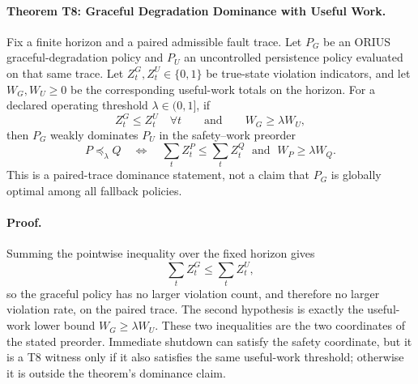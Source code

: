 \paragraph{Theorem T8: Graceful Degradation Dominance with Useful Work.}
Fix a finite horizon and a paired admissible fault trace. Let \(P_G\) be an
ORIUS graceful-degradation policy and \(P_U\) an uncontrolled persistence policy
evaluated on that same trace. Let \(Z_t^G,Z_t^U\in\{0,1\}\) be true-state
violation indicators, and let \(W_G,W_U\ge0\) be the corresponding useful-work
totals on the horizon. For a declared operating threshold
\(\lambda\in(0,1]\), if
\[
  Z_t^G\le Z_t^U\quad \forall t
  \qquad\text{and}\qquad
  W_G\ge \lambda W_U,
\]
then \(P_G\) weakly dominates \(P_U\) in the safety--work preorder
\[
  P\preceq_{\lambda} Q
  \quad\Longleftrightarrow\quad
  \sum_t Z_t^P\le\sum_t Z_t^Q
  \;\text{ and }\;
  W_P\ge\lambda W_Q .
\]
This is a paired-trace dominance statement, not a claim that \(P_G\) is globally
optimal among all fallback policies.

\paragraph{Proof.}
Summing the pointwise inequality over the fixed horizon gives
\[
  \sum_t Z_t^G\le \sum_t Z_t^U,
\]
so the graceful policy has no larger violation count, and therefore no larger
violation rate, on the paired trace. The second hypothesis is exactly the
useful-work lower bound \(W_G\ge\lambda W_U\). These two inequalities are the
two coordinates of the stated preorder. Immediate shutdown can satisfy the
safety coordinate, but it is a T8 witness only if it also satisfies the same
useful-work threshold; otherwise it is outside the theorem's dominance claim.
